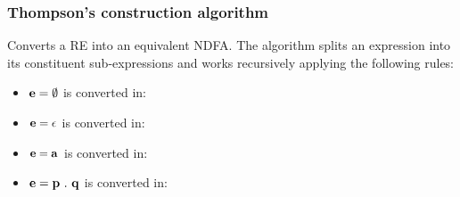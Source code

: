 \subsubsection{Thompson's construction algorithm}
Converts a RE into an equivalent NDFA. The algorithm splits an expression into its constituent sub-expressions and works recursively applying the following rules: 

\begin{itemize}
    \item  $\bf e = \emptyset$ is converted in:
    \begin{figure}[H]
        \begin{center}
        \end{center} 
    \end{figure}
    
    \item $\bf e = \epsilon$  is converted in:
    \begin{figure}[H]
        \begin{center}
        \end{center} 
    \end{figure}
    
    \item  $\bf e = a$ is converted in:
    \begin{figure}[H]
        \begin{center}
        \end{center} 
    \end{figure}
    
    \item  $\bf e = p\ .\ q$ is converted in:
    \begin{figure}[H]
        \begin{center}
        \end{center} 
    \end{figure}
    

\end{itemize}
